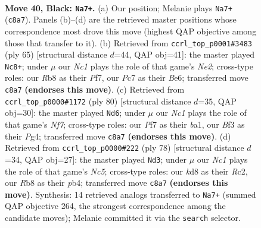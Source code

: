 \documentclass[11pt]{article}
\begin{document}
\clearpage

\begin{figure}[p]\centering
\begin{subfigure}{0.46\textwidth}\centering
\resizebox{\linewidth}{!}{%
\newchessgame
\chessboard[
  setfen={1rnK2k1/2p2p1p/p1P5/P4p2/4p3/5bP1/8/RNB5 b - - 11 40},
  showmover=false,
  pgfstyle=straightmove, color=movearrow, markmove={c8-a7}
]}
\caption{}
\end{subfigure}\hfill
\begin{subfigure}{0.46\textwidth}\centering
\resizebox{\linewidth}{!}{%
\newchessgame
\chessboard[
  setfen={8/4npk1/3Kb1p1/7p/4P2P/r1P5/4B1P1/3N3R b - - 5 33},
  showmover=false,
  pgfstyle=straightmove, color=movearrow, markmove={e7-c8}
]}
\caption{}
\end{subfigure}
\\[4pt]
\begin{subfigure}{0.46\textwidth}\centering
\resizebox{\linewidth}{!}{%
\newchessgame
\chessboard[
  setfen={2r3k1/3R1N1p/6p1/p1n5/P1p3P1/4B2P/5P2/b4K2 w - - 3 41},
  showmover=false,
  pgfstyle=straightmove, color=movearrow, markmove={f7-d6}
]}
\caption{}
\end{subfigure}\hfill
\begin{subfigure}{0.46\textwidth}\centering
\resizebox{\linewidth}{!}{%
\newchessgame
\chessboard[
  setfen={6k1/8/2r1p2b/2N1P2p/1p1P3P/2n5/2R2BPK/8 w - - 0 40},
  showmover=false,
  pgfstyle=straightmove, color=movearrow, markmove={c5-d3}
]}
\caption{}
\end{subfigure}
\caption{\textbf{Move 40, Black: \texttt{Na7+}.} (a) Our position; Melanie plays \texttt{Na7+} (\texttt{c8a7}). Panels (b)--(d) are the retrieved master positions whose correspondence most drove this move (highest QAP objective among those that transfer to it). (b) Retrieved from \texttt{ccrl\_top\_p0001\#3483} (ply 65) [structural distance $d$=44, QAP obj=41]: the master played \texttt{Nc8+}; under $\mu$ our \emph{Nc1} plays the role of that game's \emph{Ne2}; cross-type roles: our \emph{R}b8 as their \emph{P}f7, our \emph{P}c7 as their \emph{B}e6; transferred move \texttt{c8a7} \textbf{(endorses this move)}. (c) Retrieved from \texttt{ccrl\_top\_p0000\#1172} (ply 80) [structural distance $d$=35, QAP obj=30]: the master played \texttt{Nd6}; under $\mu$ our \emph{Nc1} plays the role of that game's \emph{Nf7}; cross-type roles: our \emph{P}f7 as their \emph{b}a1, our \emph{B}f3 as their \emph{P}g4; transferred move \texttt{c8a7} \textbf{(endorses this move)}. (d) Retrieved from \texttt{ccrl\_top\_p0000\#222} (ply 78) [structural distance $d$=34, QAP obj=27]: the master played \texttt{Nd3}; under $\mu$ our \emph{Nc1} plays the role of that game's \emph{Nc5}; cross-type roles: our \emph{k}d8 as their \emph{R}c2, our \emph{R}b8 as their \emph{p}b4; transferred move \texttt{c8a7} \textbf{(endorses this move)}. Synthesis: 14 retrieved analogs transferred to \texttt{Na7+} (summed QAP objective 264, the strongest correspondence among the candidate moves); Melanie committed it via the \texttt{search} selector.}
\label{fig:thought-m79}
\end{figure}
\end{document}
